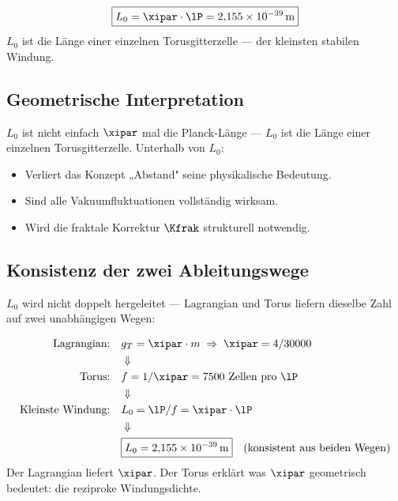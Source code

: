 \begin{keyresult}
\begin{equation}
	\boxed{L_0 = \xipar \cdot \lP = 2{,}155 \times 10^{-39}\,\text{m}}
\end{equation}
$L_0$ ist die Länge einer einzelnen Torusgitterzelle — der kleinsten stabilen Windung.
\end{keyresult}

\subsection{Geometrische Interpretation}

$L_0$ ist nicht einfach $\xipar$ mal die Planck-Länge — $L_0$ ist die Länge einer einzelnen Torusgitterzelle. Unterhalb von $L_0$:
\begin{itemize}
	\item Verliert das Konzept „Abstand" seine physikalische Bedeutung.
	\item Sind alle Vakuumfluktuationen vollständig wirksam.
	\item Wird die fraktale Korrektur $\Kfrak$ strukturell notwendig.
\end{itemize}

\subsection{Konsistenz der zwei Ableitungswege}

$L_0$ wird nicht doppelt hergeleitet — Lagrangian und Torus liefern dieselbe Zahl auf zwei unabhängigen Wegen:

\begin{keyresult}
\begin{align}
	\text{Lagrangian:} \quad & g_T = \xipar \cdot m \;\Rightarrow\; \xipar = 4/30000 \notag \\
	& \Downarrow \notag \\
	\text{Torus:} \quad & f = 1/\xipar = 7500 \text{ Zellen pro } \lP \notag \\
	& \Downarrow \notag \\
	\text{Kleinste Windung:} \quad & L_0 = \lP / f = \xipar \cdot \lP \notag \\
	& \Downarrow \notag \\
	& \boxed{L_0 = 2{,}155 \times 10^{-39}\,\text{m}} \quad \text{(konsistent aus beiden Wegen)}
\end{align}
Der Lagrangian liefert $\xipar$. Der Torus erklärt was $\xipar$ geometrisch bedeutet: die reziproke Windungsdichte.
\end{keyresult}

